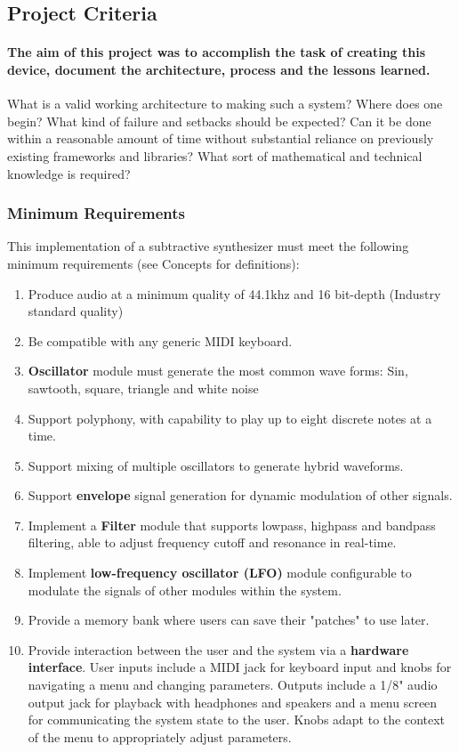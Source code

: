 \documentclass[acmlarge,screen]{acmart}
\begin{document}
\subsection{Project Criteria}
	\paragraph{The aim of this project was to accomplish the task of creating this device, document the architecture, process and the lessons learned.}What is a valid working architecture to making such a system? Where does one begin? What kind of failure and setbacks should be expected? Can it be done within a reasonable amount of time without substantial reliance on previously existing frameworks and libraries? What sort of mathematical and technical knowledge is required?
	\subsubsection{Minimum Requirements}
	\label{requirements}
	This implementation of a subtractive synthesizer must meet the following minimum requirements (see Concepts for definitions):
	\begin{enumerate}
		\item Produce audio at a minimum quality of 44.1khz and 16 bit-depth (Industry standard quality)
		\item Be compatible with any generic MIDI keyboard.
		\item \textbf{Oscillator} module must generate the most common wave forms: Sin, sawtooth, square, triangle and white noise
		\item Support polyphony, with capability to play up to eight discrete notes at a time.
		\item Support mixing of multiple oscillators to generate hybrid waveforms.
		\item Support \textbf{envelope} signal generation for dynamic modulation of other signals.
		\item Implement a \textbf{Filter} module that supports lowpass, highpass and bandpass filtering, able to adjust frequency cutoff and resonance in real-time.
		\item Implement \textbf{low-frequency oscillator (LFO)} module configurable to modulate the signals of other modules within the system.
		\item Provide a memory bank where users can save their "patches" to use later.
		\item Provide interaction between the user and the system via a \textbf{hardware interface}. User inputs include a MIDI jack for keyboard input and knobs for navigating a menu and changing parameters. Outputs include a 1/8" audio output jack for playback with headphones and speakers and a menu screen for communicating the system state to the user. Knobs adapt to the context of the menu to appropriately adjust parameters.
	\end{enumerate}
	
\end{document}
